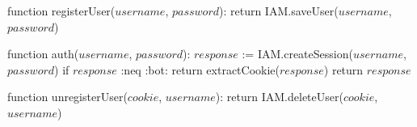 function registerUser($username$, $password$):
    return IAM.saveUser($username$, $password$)

function auth($username$, $password$):
    $response$ := IAM.createSession($username$, $password$)
    if $response$ :neq :bot:
        return extractCookie($response$)
    return $response$

function unregisterUser($cookie$, $username$):
    return IAM.deleteUser($cookie$, $username$)
